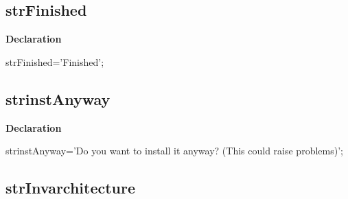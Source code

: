 \documentclass{report}
\newif\ifpdf
\begin{document}
\subsection*{strFinished}
\fi
\label{trstrings-strFinished}
\begin{list}{}{
\setlength{\itemindent}{0cm}
\setlength{\listparindent}{0cm}
\setlength{\leftmargin}{\evensidemargin}
\addtolength{\leftmargin}{\tmplength}
\settowidth{\labelsep}{X}
\addtolength{\leftmargin}{\labelsep}
\setlength{\labelwidth}{\tmplength}
}
\item[\textbf{Declaration}\hfill]
\ifpdf
\begin{flushleft}
\fi
\begin{ttfamily}
strFinished='Finished';\end{ttfamily}

\ifpdf
\end{flushleft}
\fi

\end{list}
\ifpdf
\subsection*{\large{\textbf{strinstAnyway}}\normalsize\hspace{1ex}\hrulefill}
\else
\subsection*{strinstAnyway}
\fi
\label{trstrings-strinstAnyway}
\begin{list}{}{
\setlength{\itemindent}{0cm}
\setlength{\listparindent}{0cm}
\setlength{\leftmargin}{\evensidemargin}
\addtolength{\leftmargin}{\tmplength}
\settowidth{\labelsep}{X}
\addtolength{\leftmargin}{\labelsep}
\setlength{\labelwidth}{\tmplength}
}
\item[\textbf{Declaration}\hfill]
\ifpdf
\begin{flushleft}
\fi
\begin{ttfamily}
strinstAnyway='Do you want to install it anyway? (This could raise problems)';\end{ttfamily}

\ifpdf
\end{flushleft}
\fi

\end{list}
\ifpdf
\subsection*{\large{\textbf{strInvarchitecture}}\normalsize\hspace{1ex}\hrulefill}
\else
\end{document}

